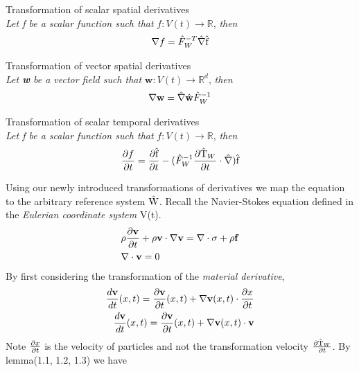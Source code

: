 \begin{lem}
Transformation of scalar spatial derivatives \\
\textit{Let f be a scalar function such that} $f: V(t) \rightarrow \mathbb{R}$, \textit{then} 
\begin{align}
\nabla f = \hat{F}_W^{-T} \hat{\nabla}\text{\^{f}}
\end{align} 
\end{lem}

\begin{lem}
Transformation of vector spatial derivatives \\
\textit{Let \textbf{w} be a vector field such that} $\mathbf{w}: V(t) \rightarrow \mathbb{R}^d$, \textit{then} 
\begin{align}
\nabla \mathbf{w} = \hat{\mathbf{\nabla}}\hat{\mathbf{w}} \hat{F}_W^{-1} 
\end{align} 
\end{lem}

\begin{lem}
Transformation of scalar temporal derivatives \\
\textit{Let f be a scalar function such that} $f: V(t) \rightarrow \mathbb{R}$, \textit{then} 
\begin{align}
\frac{\partial f}{\partial t} = \frac{\partial \text{\^{f}} }{\partial t} - (\hat{F}_W^{-1} \frac{\partial \text{\^{T}}_W}{\partial t} \cdot \hat{\nabla}) \text{\^{f}}
\end{align} 
\end{lem}


Using our newly introduced transformations of derivatives we map the equation to the arbitrary reference system $\text{\^{W}}$. Recall the Navier-Stokes equation defined in the \textit{Eulerian coordinate system} V(t).
\begin{align*}
&\rho \frac{\partial \mathbf{v}}{\partial t} + \rho \mathbf{v} \cdot \nabla \mathbf{v} =
\nabla \cdot \sigma + \rho \mathbf{f} \\
&\nabla \cdot \mathbf{v} = 0
\end{align*}
By first considering the transformation of the \textit{material derivative},
\begin{align*}
\frac{d \mathbf{v}}{dt}(x,t) = \frac{\partial \mathbf{v}}{\partial t}(x,t) + \nabla \mathbf{v}(x,t) \cdot \frac{\partial x}{\partial t} \\
\frac{d \mathbf{v}}{dt}(x,t) = \frac{\partial \mathbf{v}}{\partial t}(x,t) + \nabla \mathbf{v}(x,t) \cdot \mathbf{v}
\end{align*}
Note $\frac{\partial x}{\partial t}$ is the velocity of particles and not the transformation velocity $\frac{\partial \text{\^{T}}_W}{\partial t}$. By lemma(1.1, 1.2, 1.3) we have  


